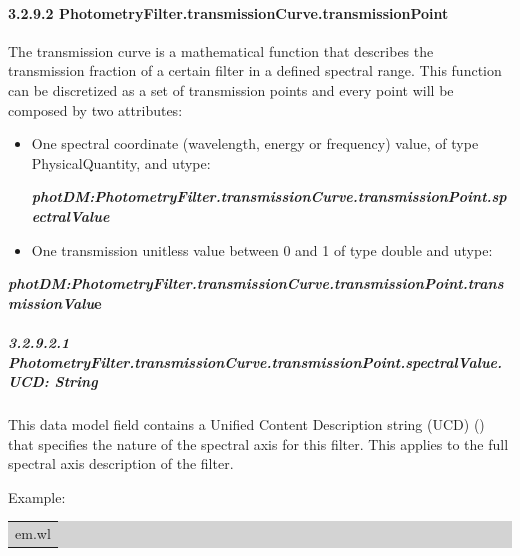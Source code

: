 \documentclass[11pt,a4paper]{ivoa}
\begin{document}
\paragraph{3.2.9.2 PhotometryFilter.transmissionCurve.transmissionPoint}
The transmission curve is a mathematical function that describes the transmission fraction of a certain filter in a defined spectral range. This function can be discretized as a set of transmission points and every point will be composed by two attributes:
\par

\begin{itemize}
	\item One spectral coordinate (wavelength, energy or frequency) value, of type PhysicalQuantity, and utype:\par

\begin{center}
{\fontsize{10pt}{12.0pt}\selectfont \textbf{\textit{photDM:PhotometryFilter.transmissionCurve.transmissionPoint.spectralValue}}\par}
\end{center}\par

	\item One transmission unitless value between 0 and 1 of type double and utype:{\fontsize{11pt}{13.2pt}\selectfont \textit{ }\par}
\end{itemize}\par

\begin{center}
{\fontsize{10pt}{12.0pt}\selectfont \textbf{\textit{photDM:PhotometryFilter.transmissionCurve.transmissionPoint.transmissionValu}e}\par}
\end{center}\par

\subparagraph{3.2.9.2.1
PhotometryFilter.transmissionCurve.transmissionPoint.spectralValue.UCD: String}
This data model field contains a Unified Content Description string (UCD) (\cite{2007ivoa.spec.0402M}) that specifies the nature of the spectral axis for this filter. This applies to the full spectral axis description of the filter.
\par

Example: 
\par



\bigskip
\par
\begingroup\setlength{\fboxsep}{0pt}
\colorbox{lightgray}{%
\begin{tabular}{|p{5.53in}|}
em.wl
\end{tabular}%
}\endgroup
\par
\bigskip
\end{document}
